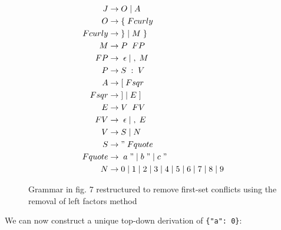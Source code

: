\documentclass[12pt, letterpaper]{article}
\theoremstyle{definition}
\begin{document}
\begin{figure}[H]
    \begin{center}
        \begin{equation}
            \begin{split}
                J &\rightarrow	O\;|\;A\\
                O &\rightarrow	\{\;Fcurly\\
                Fcurly &\rightarrow\;\}\;|\;M\;\}\\
                M &\rightarrow	P\;\;FP\\
                FP &\rightarrow\;\epsilon\;|\;,\;M\\
                P &\rightarrow	S\;:\;V\\
                A &\rightarrow	[\;Fsqr\\
                Fsqr &\rightarrow \;]\;|\;E\;]\\
                E &\rightarrow	V\;\;FV\\
                FV &\rightarrow\;\epsilon\;|\;,\;E\\
                V &\rightarrow	S\;|\;N\\
                S &\rightarrow	"\;Fquote\\
                Fquote &\rightarrow\;a\;"\;|\;b\;"\;|\;c\;"\\
                N &\rightarrow	0\;|\;1\;|\;2\;|\;3\;|\;4\;|\;5\;|\;6\;|\;7\;|\;8\;|\;9
            \end{split}
            \nonumber
        \end{equation}
    \end{center}
    \vspace{-1em}
    \caption{Grammar in fig. 7 restructured to remove first-set conflicts using the removal of left factors method}
\end{figure}

\pagebreak

We can now construct a unique top-down derivation of \verb|{"a": 0}|:
\end{document}

